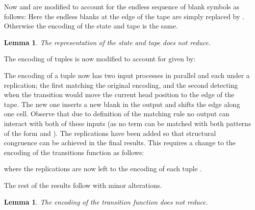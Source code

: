 \documentclass[submission,copyright,creativecommons]{eptcs}
\newtheorem{lemma}[theorem]{Lemma}
\begin{document}
Now  and  are modified to account for the
endless sequence of blank symbols  as follows:
\enclist{
}{
}
Here the endless blanks at the edge of the tape are simply replaced by .
Otherwise the encoding of the state  and tape  is the same.

\begin{lemma}
\label{lem:fin:tape-no-red}
The representation  of the state 
and tape  does not reduce.
\end{lemma}



The encoding of tuples  is now modified to account for  given by:

The encoding of a tuple now has two input processes in parallel and each under
a replication;
the first matching the original encoding, and the second detecting when the
transition would move the current head position to the edge of the tape.
The new one inserts a new blank  in the output and shifts the edge  along
one cell.
Observe that due to definition of the matching rule no output can interact
with both of these inputs (as no term can be matched with both patterns of the
form  and ).
The replications have been added so that structural congruence can be achieved in
the final results. This requires a change to the encoding of the transitions
function as follows:

where the replications are now left to the encoding of each tuple .

The rest of the results follow with minor alterations.

\begin{lemma}
\label{lem:fin:trans-no-red}
The encoding  of the transition function 
does not reduce.
\end{lemma}
\end{document}
